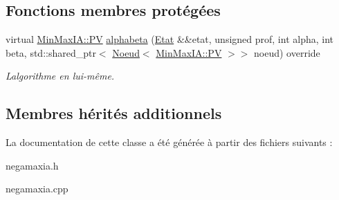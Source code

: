 \subsection*{Fonctions membres protégées}
\begin{DoxyCompactItemize}
\item 
virtual \hyperlink{structIA_1_1PV}{Min\+Max\+I\+A\+::\+PV} \hyperlink{classNegaMaxIA_a0a15182f15ecf87370b7fe82f81b6f12}{alphabeta} (\hyperlink{structEtat}{Etat} \&\&etat, unsigned prof, int alpha, int beta, std\+::shared\+\_\+ptr$<$ \hyperlink{classNoeud}{Noeud}$<$ \hyperlink{structIA_1_1PV}{Min\+Max\+I\+A\+::\+PV} $>$$>$ noeud) override\hypertarget{classNegaMaxIA_a0a15182f15ecf87370b7fe82f81b6f12}{}\label{classNegaMaxIA_a0a15182f15ecf87370b7fe82f81b6f12}

\begin{DoxyCompactList}\small\item\em L\textquotesingle{}algorithme en lui-\/même. \end{DoxyCompactList}\end{DoxyCompactItemize}
\subsection*{Membres hérités additionnels}


La documentation de cette classe a été générée à partir des fichiers suivants \+:\begin{DoxyCompactItemize}
\item 
negamaxia.\+h\item 
negamaxia.\+cpp\end{DoxyCompactItemize}
